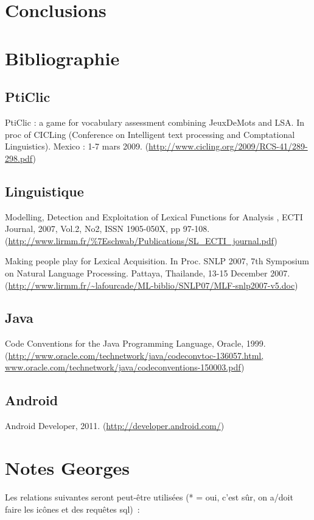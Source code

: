 \documentclass[a4paper,11pt,french]{article}
\begin{document}
\section{Conclusions}

\newpage


\section{Bibliographie}
\subsection{PtiClic}

PtiClic : a game for vocabulary assessment combining JeuxDeMots and LSA. In proc of CICLing (Conference on Intelligent text processing and Comptational Linguistics). Mexico : 1-7 mars 2009. (\url{http://www.cicling.org/2009/RCS-41/289-298.pdf})


\subsection{Linguistique}

Modelling, Detection and Exploitation of Lexical Functions for Analysis , ECTI Journal, 2007, Vol.2, No2, ISSN 1905-050X, pp 97-108. (\url{http://www.lirmm.fr/\%7Eschwab/Publications/SL_ECTI_journal.pdf})

Making people play for Lexical Acquisition. In Proc. SNLP 2007, 7th Symposium on Natural Language Processing. Pattaya, Thailande, 13-15 December 2007. (\url{http://www.lirmm.fr/~lafourcade/ML-biblio/SNLP07/MLF-snlp2007-v5.doc})


\subsection{Java}

Code Conventions for the Java Programming Language, Oracle, 1999. (\url{http://www.oracle.com/technetwork/java/codeconvtoc-136057.html, www.oracle.com/technetwork/java/codeconventions-150003.pdf})

\subsection{Android}

Android Developer, 2011. (\url{http://developer.android.com/})




\section{Notes Georges}
Les relations suivantes seront peut-être utilisées (* = oui, c'est sûr, on a/doit faire les icônes et des requêtes sql)~:
\end{document}
